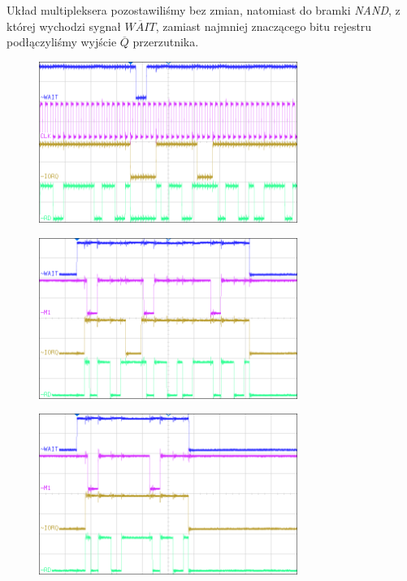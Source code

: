 \documentclass[fleqn]{article}
\begin{document}
Układ multipleksera pozostawiliśmy bez zmian, natomiast do bramki \textit{NAND}, z której wychodzi sygnał $\overline{WAIT}$, zamiast najmniej znaczącego bitu rejestru podłączyliśmy wyjście $\overline{Q}$ przerzutnika.


\begin{figure}[H]
	\centering
	\includegraphics[width=0.75\textwidth]{img/3a.png}
	\caption{}
\end{figure}

\begin{figure}[H]
	\centering
	\includegraphics[width=0.75\textwidth]{img/3b.png}
	\caption{}
\end{figure}

\begin{figure}[H]
	\centering
	\includegraphics[width=0.75\textwidth]{img/3c.png}
	\caption{}
\end{figure}
\end{document}
